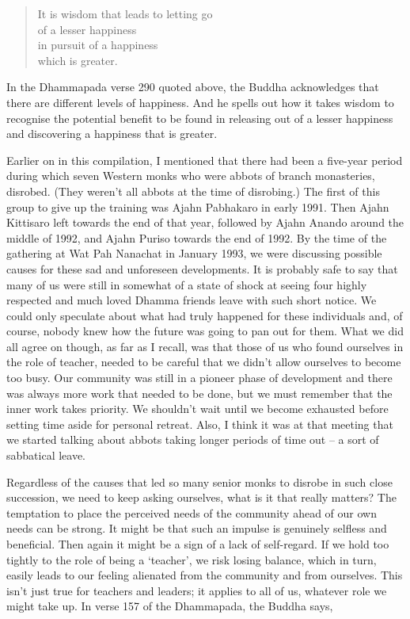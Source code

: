 \begin{quote}
  It is wisdom that leads to letting go\\
  of a lesser happiness\\
  in pursuit of a happiness\\
  which is greater.
\end{quote}

In the Dhammapada verse 290 quoted above, the Buddha acknowledges that
there are different levels of happiness. And he spells out how it takes
wisdom to recognise the potential benefit to be found in releasing out
of a lesser happiness and discovering a happiness that is greater.

\sectionBreak

Earlier on in this compilation, I mentioned that there had been a
five-year period during which seven Western monks who were abbots of
branch monasteries, disrobed. (They weren't all abbots at the time of
disrobing.) The first of this group to give up the training was Ajahn
Pabhakaro in early 1991. Then Ajahn Kittisaro left towards the end of
that year, followed by Ajahn Anando around the middle of 1992, and Ajahn
Puriso towards the end of 1992. By the time of the gathering at Wat Pah
Nanachat in January 1993, we were discussing possible causes for these
sad and unforeseen developments. It is probably safe to say that many of
us were still in somewhat of a state of shock at seeing four highly
respected and much loved Dhamma friends leave with such short notice. We
could only speculate about what had truly happened for these individuals
and, of course, nobody knew how the future was going to pan out for
them. What we did all agree on though, as far as I recall, was that
those of us who found ourselves in the role of teacher, needed to be
careful that we didn't allow ourselves to become too busy. Our community
was still in a pioneer phase of development and there was always more
work that needed to be done, but we must remember that the inner work
takes priority. We shouldn't wait until we become exhausted before
setting time aside for personal retreat. Also, I think it was at that
meeting that we started talking about abbots taking longer periods of
time out -- a sort of sabbatical leave.

Regardless of the causes that led so many senior monks to disrobe in
such close succession, we need to keep asking ourselves, what is it that
really matters? The temptation to place the perceived needs of the
community ahead of our own needs can be strong. It might be that such an
impulse is genuinely selfless and beneficial. Then again it might be a
sign of a lack of self-regard. If we hold too tightly to the role of
being a `teacher', we risk losing balance, which in turn, easily leads
to our feeling alienated from the community and from ourselves. This
isn't just true for teachers and leaders; it applies to all of us,
whatever role we might take up. In verse 157 of the Dhammapada, the
Buddha says,


